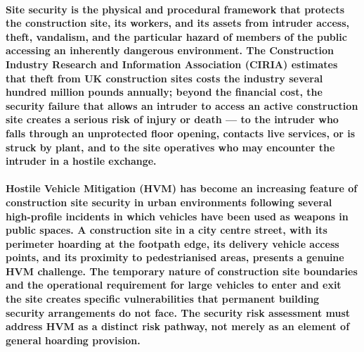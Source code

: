 \paragraph{Site security is the physical and procedural framework that protects the construction site, its workers, and its assets from intruder access, theft, vandalism, and the particular hazard of members of the public accessing an inherently dangerous environment. The Construction Industry Research and Information Association (CIRIA) estimates that theft from UK construction sites costs the industry several hundred million pounds annually; beyond the financial cost, the security failure that allows an intruder to access an active construction site creates a serious risk of injury or death --- to the intruder who falls through an unprotected floor opening, contacts live services, or is struck by plant, and to the site operatives who may encounter the intruder in a hostile exchange.}

\paragraph{Hostile Vehicle Mitigation (HVM) has become an increasing feature of construction site security in urban environments following several high-profile incidents in which vehicles have been used as weapons in public spaces. A construction site in a city centre street, with its perimeter hoarding at the footpath edge, its delivery vehicle access points, and its proximity to pedestrianised areas, presents a genuine HVM challenge. The temporary nature of construction site boundaries and the operational requirement for large vehicles to enter and exit the site creates specific vulnerabilities that permanent building security arrangements do not face. The security risk assessment must address HVM as a distinct risk pathway, not merely as an element of general hoarding provision.}



